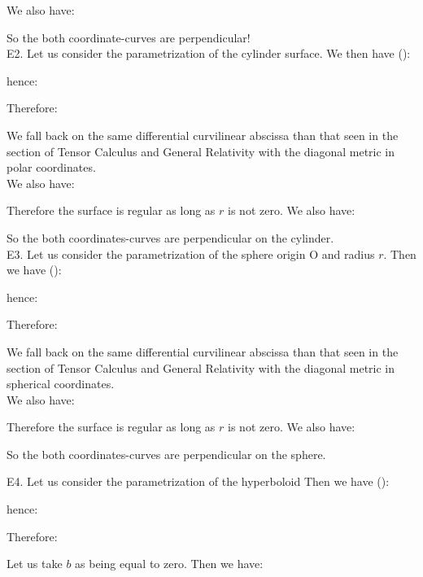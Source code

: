 {\begin{tcolorbox}[colframe=black,colback=white,sharp corners]
	We also have:
	
	So the both coordinate-curves are perpendicular!\\
	
	E2. Let us consider the parametrization of the cylinder surface. We then have ():
	
	hence:
	
	\end{tcolorbox}
	
	\begin{tcolorbox}[colframe=black,colback=white,sharp corners]
	Therefore:
	
	We fall back on the same differential curvilinear abscissa than that seen in the section of Tensor Calculus and General Relativity with the diagonal metric in polar coordinates.\\
	
	We also have:
	
	Therefore the surface is regular as long as $r$ is not zero. We also have:
	
	So the both coordinates-curves are perpendicular on the cylinder.\\
	
	E3. Let us consider the parametrization of the sphere origin O and radius $r$. Then we have ():
	
	hence:
	
	Therefore:
	
	We fall back on the same differential curvilinear abscissa than that seen in the section of Tensor Calculus and General Relativity with the diagonal metric in spherical coordinates.\\
	
	We also have:
	
	Therefore the surface is regular as long as $r$ is not zero. We also have:
	
	So the both coordinates-curves are perpendicular on the sphere.\\
	\end{tcolorbox}
	
	\begin{tcolorbox}[colframe=black,colback=white,sharp corners]
	E4. Let us consider the parametrization of the hyperboloid  Then we have ():
	
	hence:
	
	Therefore:
	
	Let us take $b$ as being equal to zero. Then we have:
	

\end{tcolorbox}}
